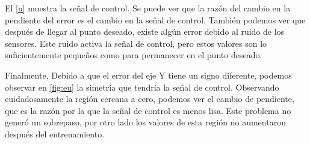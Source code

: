 
El \cref{u} muestra la señal de control. Se puede ver que la razón del cambio en la pendiente del error es el cambio en la señal de control. También podemos ver que después de llegar al punto deseado, existe algún error debido al ruido de los sensores. Este ruido activa la señal de control, pero estos valores son lo suficientemente pequeños como para permanecer en el punto deseado.





Finalmente,%
Debido a que el error del eje Y tiene un signo diferente, podemos observar en \cref{fig:eu} la simetría que tendría la señal de control. Observando cuidadosamente la región cercana a cero, podemos ver el cambio de pendiente, que es la razón por la que la señal de control es menos lisa. Este problema no generó un sobrepaso, por otro lado los valores de esta región no aumentaron después del entrenamiento.





